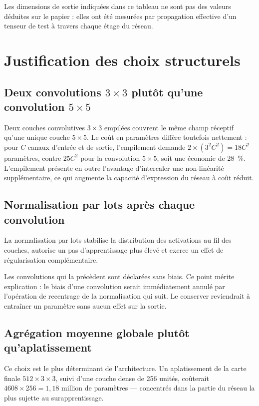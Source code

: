 \documentclass[a4paper,12pt]{report}
\begin{document}
Les dimensions de sortie indiquées dans ce tableau ne sont pas des valeurs
déduites sur le papier : elles ont été mesurées par propagation effective d'un
tenseur de test à travers chaque étage du réseau.

\section{Justification des choix structurels}

\subsection{Deux convolutions $3\times3$ plutôt qu'une convolution $5\times5$}

Deux couches convolutives $3\times3$ empilées couvrent le même champ réceptif
qu'une unique couche $5\times5$. Le coût en paramètres diffère toutefois
nettement : pour $C$ canaux d'entrée et de sortie, l'empilement demande
$2\times(3^2 C^2) = 18C^2$ paramètres, contre $25C^2$ pour la convolution
$5\times5$, soit une économie de 28~\%. L'empilement présente en outre
l'avantage d'intercaler une non-linéarité supplémentaire, ce qui augmente la
capacité d'expression du réseau à coût réduit.

\subsection{Normalisation par lots après chaque convolution}

La normalisation par lots stabilise la distribution des activations au fil des
couches, autorise un pas d'apprentissage plus élevé et exerce un effet de
régularisation complémentaire.

Les convolutions qui la précèdent sont déclarées sans biais. Ce point mérite
explication : le biais d'une convolution serait immédiatement annulé par
l'opération de recentrage de la normalisation qui suit. Le conserver
reviendrait à entraîner un paramètre sans aucun effet sur la sortie.

\subsection{Agrégation moyenne globale plutôt qu'aplatissement}

Ce choix est le plus déterminant de l'architecture. Un aplatissement de la carte
finale $512\times3\times3$, suivi d'une couche dense de 256 unités, coûterait
$4608 \times 256 = 1{,}18$ million de paramètres --- concentrés dans la partie du
réseau la plus sujette au surapprentissage.
\end{document}
